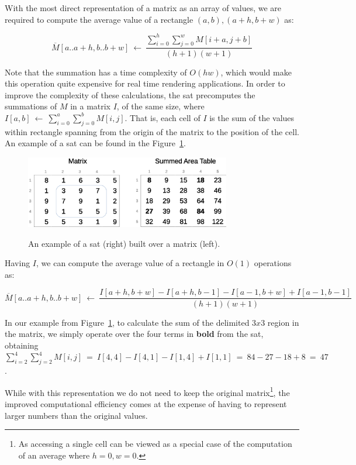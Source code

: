 \documentclass[a4paper,10pt,twoside]{book}
\begin{document}
    With the most direct representation of a matrix as an array of values, we are required to compute the average value of a rectangle $(a,b),(a+h,b+w)$ as:
    
    \[
    \overline{M}[a..a+h,b..b+w]~\leftarrow~
    \frac{\displaystyle\sum^h_{i=0}\displaystyle\sum^w_{j=0}M[i+a,j+b]}
    {(h+1)(w+1)}
    \]
    
    Note that the summation has a time complexity of $O(hw)$, which would make this operation quite expensive for real time rendering applications. In order to improve the complexity of these calculations, the \gls{sat} precomputes the summations of $M$ in a matrix $I$, of the same size, where $I[a,b]~\leftarrow~\displaystyle\sum^a_{i=0}\displaystyle\sum^b_{j=0}M[i,j]$. That is, each cell of $I$ is the sum of the values within rectangle spanning from the origin of the matrix to the position of the cell. An example of a \gls{sat} can be found in the Figure~\ref{fig:sat}.
    
    \begin{figure}[ht]
		\begin{center}
			{\includegraphics[width=0.8\textwidth]{figures/example_sat.eps}}
		\end{center}
		\caption{An example of a \acrlong{sat} (right) built over a matrix (left).}
		\label{fig:sat}
	\end{figure}
    
    Having $I$, we can compute the average value of a rectangle in $O(1)$ operations as:
    
    \[
    \overline{M}[a..a+h,b..b+w]~\leftarrow~
    \frac{I[a+h,b+w] - I[a+h,b-1] - I[a-1,b+w] + I[a-1,b-1]}
    {(h+1)(w+1)}
    \]
    
    In our example from Figure~\ref{fig:sat}, to calculate the sum of the delimited $3x3$ region in the matrix, we simply operate over the four terms in \textbf{bold} from the \gls{sat}, obtaining
    $\displaystyle\sum^4_{i=2}\displaystyle\sum^4_{j=2}M[i,j]~=~I[4,4]-I[4,1]-I[1,4]+I[1,1]~=~84-27-18+8~=~47$.
    
    While with this representation we do not need to keep the original matrix\footnote{As accessing a single cell can be viewed as a special case of the computation of an average where $h=0,w=0$.}, the improved computational efficiency comes at the expense of having to represent larger numbers than the original values.
	
\end{document}
